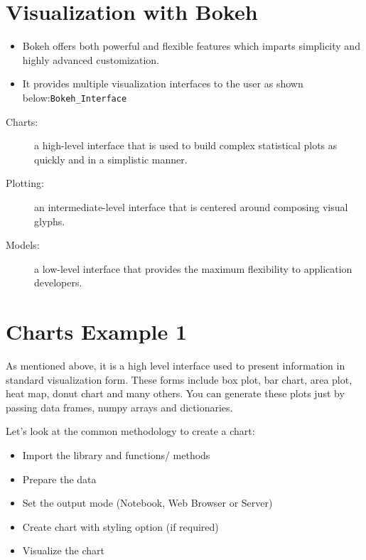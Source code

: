 \documentclass[a4paper,12pt]{article}
\begin{document}
\section*{Visualization with Bokeh}
\begin{itemize}
	\item Bokeh offers both powerful and flexible features which imparts simplicity and highly advanced customization. 
	
	
	
	\item It provides multiple visualization interfaces to the user as shown below:\texttt{Bokeh\_Interface}
\end{itemize}



\begin{description}
	\item[Charts:] a high-level interface that is used to build complex statistical plots as quickly and in a simplistic manner.
	\item[Plotting:] an intermediate-level interface that is centered around composing visual glyphs.
	\item[Models:] a low-level interface that provides the maximum flexibility to application developers.
\end{description}
%


\newpage

\section*{Charts Example 1}

As mentioned above, it is a high level interface used to present information in standard visualization form. 
These forms include box plot, bar chart, area plot, heat map, donut chart and many others. You can generate these plots just by passing data frames, numpy arrays and dictionaries.

Let’s look at the common methodology to create a chart:

\begin{itemize}
	\item Import the library and functions/ methods
	\item Prepare the data
	\item Set the output mode (Notebook, Web Browser or Server)
	\item Create chart with styling option (if required)
	\item Visualize the chart
\end{itemize}
\end{document}
